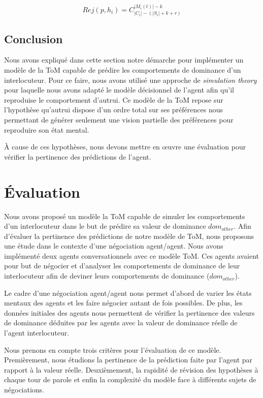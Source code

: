 \begin{equation}
Rej(p, h_i) = C_{|C_i|-(|S_i| + k + r)}^{|M_i(t)| - k}
\end{equation}

\subsection{Conclusion}
	Nous avons expliqué dans cette section notre démarche pour implémenter un modèle de la ToM capable de prédire les comportements de dominance d'un interlocuteur. Pour ce faire, nous avons utilisé une approche de \emph{simulation theory} pour laquelle nous avons adapté le modèle décisionnel de l'agent afin qu'il reproduise le comportement d'autrui. Ce modèle de la ToM repose sur l'hypothèse qu'autrui dispose d'un ordre total sur ses préférences nous permettant de générer  seulement une vision partielle des préférences pour reproduire son état mental. 
	
	À cause de ces hypothèses, nous devons mettre en œuvre une évaluation pour vérifier la pertinence des prédictions de l'agent.

\section{Évaluation}

Nous avons proposé un modèle la ToM capable de simuler les comportements d'un interlocuteur dans le but de prédire sa valeur de dominance $dom_{other}$. Afin d'évaluer la pertinence des prédictions de notre modèle de ToM, nous proposons une étude  dans le contexte d'une négociation agent/agent. Nous avons implémenté  deux agents conversationnels avec ce modèle ToM. Ces agents avaient pour but de négocier et d'analyser les comportements de dominance de leur interlocuteur afin de deviner leurs comportements de dominance ($dom_{other}$).

Le cadre d'une négociation agent/agent nous permet d'abord de varier les états mentaux des agents et les faire négocier autant de fois possibles.
De plus, les données initiales des agents nous permettent de vérifier la pertinence des valeurs de dominance déduites par les agents avec la valeur de dominance réelle de l'agent interlocuteur. 

Nous prenons en compte trois critères pour l'évaluation de ce modèle. Premièrement, nous étudions la pertinence de la prédiction faite par l'agent par rapport à la valeur réelle. Deuxièmement, la rapidité de révision des hypothèses à chaque tour de parole et enfin la complexité du modèle face à différents sujets de négociations.

